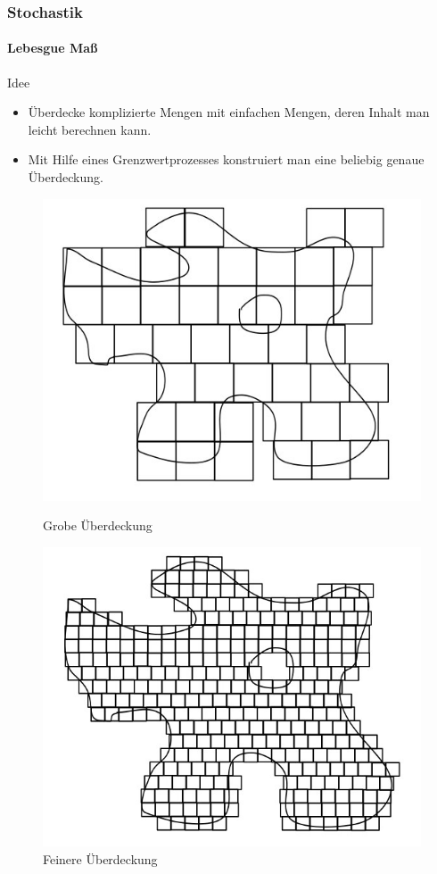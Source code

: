 \documentclass{beamer}
\begin{document}
\begin{frame}
    \frametitle{Stochastik}
\framesubtitle{Lebesgue Maß}
    \begin{block}{Idee}
\begin{itemize}
\item Überdecke komplizierte Mengen mit einfachen Mengen, deren Inhalt man leicht berechnen kann.
\item \pause Mit Hilfe eines Grenzwertprozesses konstruiert man eine beliebig genaue Überdeckung.
\end{itemize}
\end{block}
\begin{figure}[!tbp]
  \centering
  \begin{minipage}[b]{0.4\textwidth}
    \includegraphics[width=\textwidth]{img/leb1-2}
    \caption{Grobe Überdeckung}
  \end{minipage}
  \hfill
  \begin{minipage}[b]{0.4\textwidth}
    \includegraphics[width=\textwidth]{img/leb2-11}
    \caption{Feinere Überdeckung}
  \end{minipage}
\end{figure}
 \end{frame}
\end{document}
